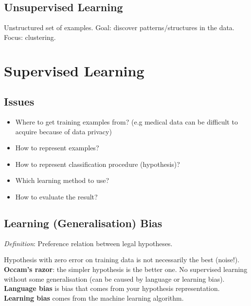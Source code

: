 \documentclass[11pt]{article}
\begin{document}
\subsection{Unsupervised Learning}
\label{sec:orgffb7ffe}
Unstructured set of examples.
Goal: discover patterns/structures in the data.
Focus: clustering.

\section{Supervised Learning}
\label{sec:org82fc0d5}
\subsection{Issues}
\label{sec:orgb728122}
\begin{itemize}
\item Where to get training examples from? (e.g medical data can be difficult to acquire because of data privacy)
\item How to represent examples?
\item How to represent classification procedure (hypothesis)?
\item Which learning method to use?
\item How to evaluate the result?
\end{itemize}

\subsection{Learning (Generalisation) Bias}
\label{sec:orgd389894}
\emph{Definition}: Preference relation between legal hypotheses.

Hypothesis with zero error on training data is not necessarily the best (noise!).
\textbf{Occam's razor}: the simpler hypothesis is the better one.
No supervised learning without some generalisation (can be caused by language or learning bias).
\textbf{Language bias} is bias that comes from your hypothesis representation.
\textbf{Learning bias} comes from the machine learning algorithm.
\end{document}
